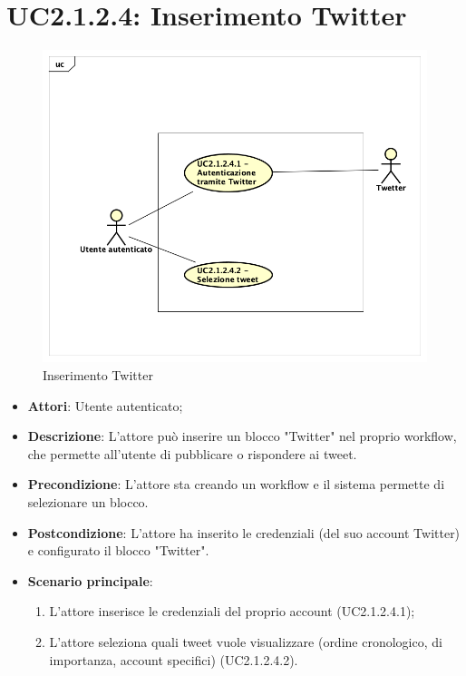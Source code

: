 \section{UC2.1.2.4: Inserimento Twitter}
\label{UC2.1.2.4}
\begin{figure}[h]
	\centering
	\includegraphics[scale=0.4]{Diagram/UC2-1-2-4.png}
	\caption{Inserimento Twitter}\label{}
\end{figure}
\begin{itemize}
	\item \textbf{Attori}: Utente autenticato;
	\item \textbf{Descrizione}: L'attore può inserire un blocco "Twitter" nel proprio workflow, che permette all'utente di pubblicare o rispondere ai tweet.
	\item \textbf{Precondizione}: L'attore sta creando un workflow e il sistema permette di selezionare un blocco.
	\item \textbf{Postcondizione}: L'attore ha inserito le credenziali (del suo account Twitter) e configurato il blocco "Twitter".
	\item \textbf{Scenario principale}:
	\begin{enumerate} 
		\item  L'attore inserisce le credenziali del proprio account (UC2.1.2.4.1);  
		\item  L'attore seleziona quali tweet vuole visualizzare (ordine cronologico, di importanza, account specifici) (UC2.1.2.4.2).
	\end{enumerate}
\end{itemize}

